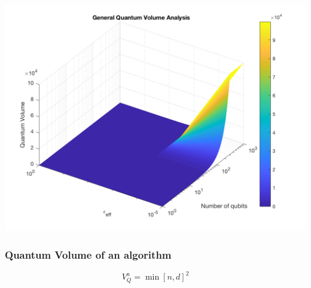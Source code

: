 \documentclass[11pt]{article}
\begin{document}
\begin{minipage}{.45\textwidth}

\begin{center}
\includegraphics[width=.9\linewidth]{general_QV1.png}
\end{center}

\label{fig:deviceQV1}

\end{minipage}%

\subsubsection{Quantum Volume of an algorithm}
\label{sec:orgf08f362}



$$V_Q^a = \min \left[ n,d \right]^2$$

\end{document}
